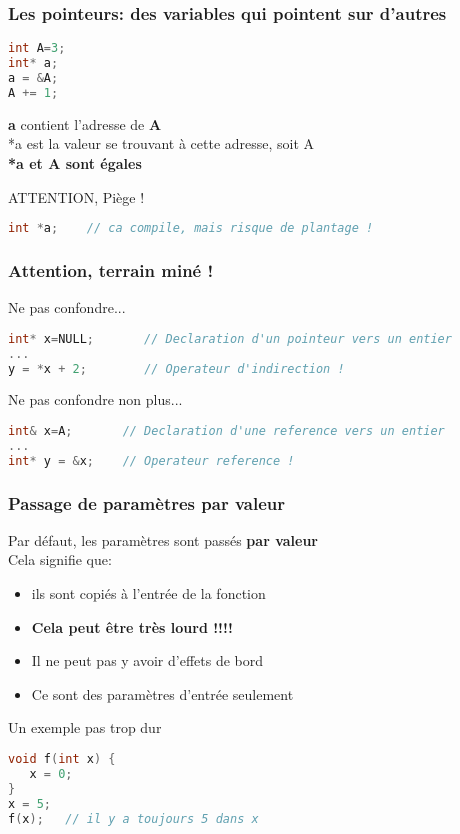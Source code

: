 \documentclass{beamer}
\begin{document}
\begin{frame}[fragile=singleslide,shrink=20]
\frametitle{Les pointeurs: des variables qui pointent sur d'autres}

\begin{lstlisting}[language=c++]
int A=3;
int* a;
a = &A;
A += 1;
\end{lstlisting}

\textbf{a} contient l'adresse de \textbf{A} \\
*a est la valeur se trouvant à cette adresse, soit A \\
\textbf{*a et A sont égales}

\begin{block}{ATTENTION, Piège !}
\begin{lstlisting}[language=c++]
int *a;    // ca compile, mais risque de plantage !
\end{lstlisting}
\end{block}
\end{frame}

\begin{frame}[fragile=singleslide,shrink=20]
\frametitle{Attention, terrain miné !}

\begin{block}{Ne pas confondre...}
\begin{lstlisting}[language=c++]
int* x=NULL;       // Declaration d'un pointeur vers un entier
...
y = *x + 2;        // Operateur d'indirection !

\end{lstlisting}
\end{block}

\begin{block}{Ne pas confondre non plus...}
\begin{lstlisting}[language=c++]
int& x=A;       // Declaration d'une reference vers un entier
...
int* y = &x;    // Operateur reference !

\end{lstlisting}
\end{block}
\end{frame}

\begin{frame}[fragile=singleslide,shrink=20]
\frametitle{Passage de paramètres par valeur}
Par défaut, les paramètres sont passés \textbf{par valeur} \\
Cela signifie que:
\begin{itemize}
\item{ils sont copiés à l'entrée de la fonction}
\item{\textbf{Cela peut être très lourd !!!!}}
\item{Il ne peut pas y avoir d'effets de bord}
\item{Ce sont des paramètres d'entrée seulement}
\end{itemize}

\begin{block}{Un exemple pas trop dur}
\begin{lstlisting}[language=c++]
void f(int x) {
   x = 0;
}
x = 5;
f(x);   // il y a toujours 5 dans x 
\end{lstlisting}
\end{block}
\end{frame}
\end{document}
